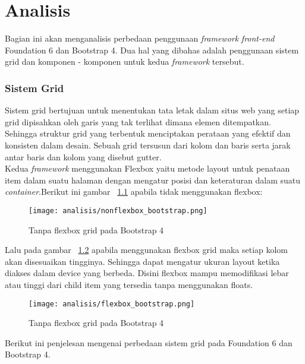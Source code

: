 \chapter{Analisis}
Bagian ini akan menganalisis perbedaan penggunaan \textit{framework} \textit{front-end} Foundation 6 dan Bootstrap 4. Dua hal yang dibahas adalah penggunaan sistem grid dan komponen - komponen untuk kedua \textit{framework} tersebut.
\subsection{Sistem Grid}
Sistem grid bertujuan untuk menentukan tata letak dalam situs web yang setiap grid dipisahkan oleh garis yang tak terlihat dimana elemen ditempatkan.  Sehingga struktur grid yang terbentuk menciptakan perataan yang efektif dan konsisten dalam desain. Sebuah grid tersusun dari kolom dan baris serta jarak antar baris dan kolom yang disebut gutter. \\
\noindent Kedua \textit{framework} menggunakan Flexbox yaitu metode layout untuk penataan item dalam suatu halaman dengan mengatur posisi dan keteraturan dalam suatu \textit{container}.\noindent Berikut ini gambar ~\ref{fig:nonflexbox} apabila tidak menggunakan flexbox:
\begin{figure} [H]
	\centering  
	\texttt{[image: analisis/nonflexbox\_bootstrap.png]}  
	\caption{Tanpa flexbox grid pada Bootstrap 4}
	\label{fig:nonflexbox}	 
\end{figure}
\noindent Lalu pada gambar ~\ref{fig:flexbox} apabila menggunakan flexbox grid maka setiap kolom akan disesuaikan tingginya. Sehingga dapat mengatur ukuran layout ketika diakses dalam device yang berbeda. Disini flexbox mampu memodifikasi lebar atau tinggi dari child item yang tersedia tanpa menggunakan floats.
\begin{figure} [H]
	\centering  
	\texttt{[image: analisis/flexbox\_bootstrap.png]}  
	\caption{Tanpa flexbox grid pada Bootstrap 4}
	\label{fig:flexbox}	 
\end{figure}
Berikut ini penjelesan mengenai perbedaan sistem grid pada Foundation 6 dan Bootstrap 4.
